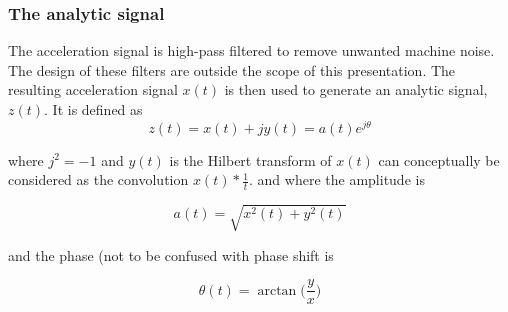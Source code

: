 \begin{frame}
    \frametitle{The analytic signal}
    \small
    The acceleration signal is high-pass filtered to remove unwanted machine noise.  The design of these filters are outside the scope of this presentation.  The resulting acceleration signal $x(t)$ is then used to generate an analytic signal, $z(t)$.  It is defined as 
    \begin{equation}
        z(t) = x(t) + j y(t) = a(t) e^{j\theta}
    \end{equation}
    
    where $j^2=-1$ and $y(t)$ is the Hilbert transform of $x(t)$ can conceptually be considered as the convolution $x(t) * \frac{1}{t}$. and where the amplitude is
    
    \begin{equation}
        a(t) = \sqrt{x^2(t)+y^2(t)}
    \end{equation}
    
    and the phase (not to be confused with phase shift is
    
    \begin{equation}
        \theta(t) = \arctan\Big(\frac{y}{x}\Big)
    \end{equation}
   
\end{frame}